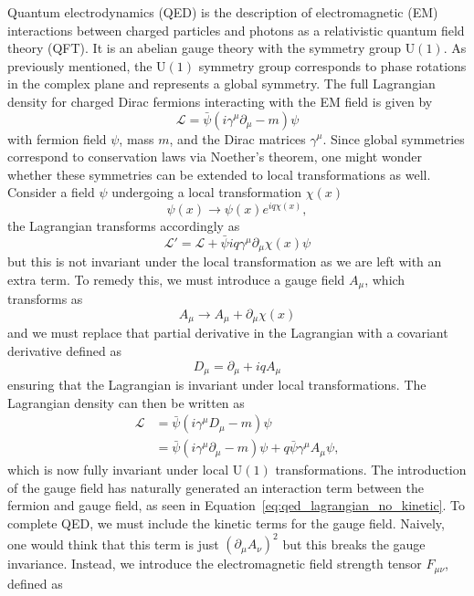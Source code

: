 Quantum electrodynamics (QED) is the description of electromagnetic (EM) interactions between charged particles and photons as a relativistic quantum field theory (QFT). It is an abelian gauge theory with the symmetry group $\mathrm{U}(1)$. As previously mentioned, the $\mathrm{U}(1)$ symmetry group corresponds to phase rotations in the complex plane and represents a global symmetry. The full Lagrangian density for charged Dirac fermions interacting with the EM field is given by
\begin{equation}
  \mathcal{L} = \bar{\psi}(i\gamma^{\mu}\partial_{\mu} - m)\psi 
  \label{eq:qed_dirac_lagrangian}
\end{equation}
with fermion field $\psi$, mass $m$, and the Dirac matrices $\gamma^{\mu}$. Since global symmetries correspond to conservation laws via Noether's theorem, one might wonder whether these symmetries can be extended to local transformations as well. Consider a field $\psi$ undergoing a local transformation $\chi(x)$
\begin{equation}
  \psi(x) \to \psi(x)e^{i q\chi(x)}, 
  \label{eq:qed_local_symmetry}
\end{equation}
the Lagrangian transforms accordingly as
\begin{equation}
  \mathcal{L}' = \mathcal{L} + \bar{\psi} iq\gamma^{\mu}\partial_{\mu}\chi(x) \psi
  \label{eq:qed_local_lagrangian}
\end{equation}
but this is not invariant under the local transformation as we are left with an extra term. To remedy this, we must introduce a gauge field $A_{\mu}$, which transforms as
\begin{equation}
  A_{\mu} \to A_{\mu} + \partial_{\mu}\chi(x)
  \label{eq:qed_gauge_transformation}
\end{equation}
and we must replace that partial derivative in the Lagrangian with a covariant derivative defined as
\begin{equation}
  D_{\mu} = \partial_{\mu} + iqA_{\mu}
  \label{eq:qed_covariant_derivative}
\end{equation}
ensuring that the Lagrangian is invariant under local transformations. The Lagrangian density can then be written as
\begin{align}
  \mathcal{L} 
  &= \bar{\psi}(i\gamma^{\mu}D_{\mu} - m)\psi \nonumber \\
  &= \bar{\psi}(i\gamma^{\mu}\partial_{\mu} - m)\psi + q\bar{\psi}\gamma^{\mu}A_{\mu}\psi, 
  \label{eq:qed_lagrangian_no_kinetic}
\end{align}
which is now fully invariant under local $\mathrm{U}(1)$ transformations. The introduction of the gauge field has naturally generated an interaction term between the fermion and gauge field, as seen in Equation~\ref{eq:qed_lagrangian_no_kinetic}. To complete QED, we must include the kinetic terms for the gauge field. Naively, one would think that this term is just ${(\partial_{\mu}A_{\nu})}^{2}$ but this breaks the gauge invariance. Instead, we introduce the electromagnetic field strength tensor $F_{\mu\nu}$, defined as
